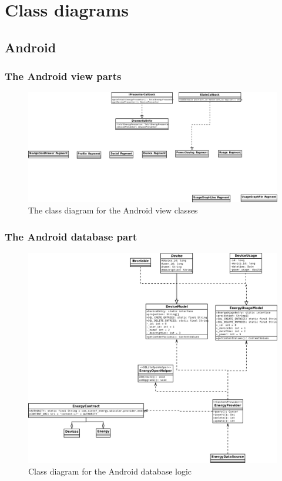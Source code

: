 \section{Class diagrams}

\subsection{Android}
\subsubsection{The Android view parts}
\begin{figure}[H]
\includegraphics[width=\textwidth]{ch/architecture/fig/ClassDiagramAndroid.png}
\caption{The class diagram for the Android view classes}
\end{figure}

\subsubsection{The Android database part}
\begin{figure}[H]
\includegraphics[width=\textwidth]{ch/architecture/fig/classDiagramAndroidDatabase.png}
\caption{Class diagram for the Android database logic}
\end{figure}

